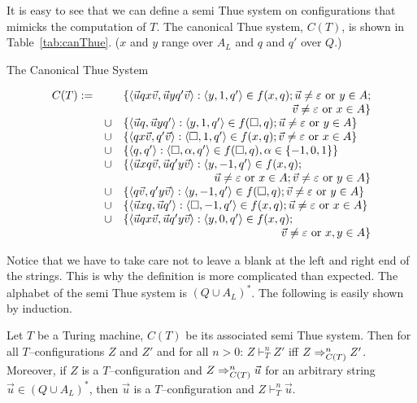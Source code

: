 It is easy to see that we can define a semi Thue system on
configurations that mimicks the computation of $T$. The canonical 
Thue system, $C(T)$, 
is shown in Table~\ref{tab:canThue}. 
($x$ and $y$ range over $A_L$ and $q$ and $q'$ over $Q$.)
\begin{table}
\caption{The Canonical Thue System}
\label{tab:canThue}
$$\begin{array}{lll}
C(T) := &  & \{\auf \vec{u}qx\vec{v}, \vec{u}yq'\vec{v}\zu :
    \auf y,1,q'\zu \in f(x,q); \vec{u} \neq \varepsilon \mbox{ or }
    y \in A; \\
    & & \multicolumn{1}{r}{ \vec{v} \neq \varepsilon \mbox{ or } x \in A\}} \\
& \cup & \{\auf \vec{u}q, \vec{u}yq'\zu : \auf y,1,q'\zu \in
    f(\square,q); \vec{u} \neq \varepsilon
    \mbox{ or } y \in A\} \\
& \cup & \{\auf qx\vec{v}, q'\vec{v}\zu : \auf \square,1,q'\zu
    \in f(x,q); \vec{v} \neq \varepsilon \mbox{ or } x\in A\} \\
& \cup & \{\auf q, q'\zu : \auf \square,\alpha,q'\zu
    \in f(\square,q), \alpha \in \{-1,0,1\}\} \\
& \cup & \{\auf \vec{u}xq\vec{v}, \vec{u}q'y\vec{v}\zu :
    \auf y,-1,q'\zu \in f(x,q); \\
    & & \multicolumn{1}{r}{
    \vec{u} \neq \varepsilon \mbox{ or } x \in A; 
    \vec{v} \neq \varepsilon \mbox{ or } y \in A\}} \\
& \cup & \{\auf q\vec{v}, q'y\vec{v}\zu : \auf y,-1,q'\zu \in
    f(\square,q); \vec{v} \neq \varepsilon \mbox{ or }
    y \in A\} \\
& \cup & \{\auf \vec{u}xq, \vec{u}q'\zu :
    \auf \square,-1,q'\zu \in f(x,q); \vec{u} \neq
    \varepsilon \mbox{ or } x \in A\} \\
& \cup & \{\auf \vec{u}qx\vec{v}, \vec{u}q'y\vec{v}\zu :
    \auf y,0,q'\zu \in f(x,q); \\
    & & \multicolumn{1}{r}{\vec{v} \neq \varepsilon\mbox{ or }
    x, y \in A\}}
\end{array}$$
\end{table}
Notice that we have to take care not to leave a blank at the
left and right end of the strings. This is why the definition is
more complicated than expected. The alphabet of the semi Thue system
is $(Q \cup A_L)^{\ast}$. The following is easily shown
by induction.
\begin{prop}
Let $T$ be a Turing machine, $C(T)$ be its associated semi Thue
system. Then for all $T$--configurations $Z$ and $Z'$ and for all 
$n >0$: $Z \vdash^n_T Z'$ iff $Z \Rightarrow_{C(T)}^n Z'$.
Moreover, if $Z$ is a $T$--configuration and $Z \Rightarrow_{C(T)}^n
\vec{u}$ for an arbitrary string $\vec{u} \in (Q \cup A_L)^{\ast}$,
then $\vec{u}$ is a $T$--configuration and $Z \vdash^n_T \vec{u}$.
\end{prop}
